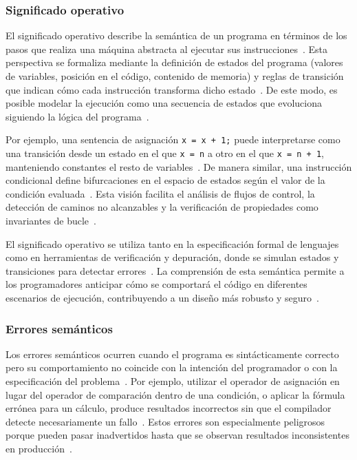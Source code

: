 \documentclass[12pt,twoside]{book}
\begin{document}
					\subsubsection{Significado operativo}
						El significado operativo describe la semántica de un programa en términos de los pasos que realiza una máquina abstracta al ejecutar sus instrucciones~\cite{Tanenbaum2021Structured}. Esta perspectiva se formaliza mediante la definición de estados del programa (valores de variables, posición en el código, contenido de memoria) y reglas de transición que indican cómo cada instrucción transforma dicho estado~\cite{Stallings2021Computer}. De este modo, es posible modelar la ejecución como una secuencia de estados que evoluciona siguiendo la lógica del programa~\cite{Sommerville2015Software}.
						
						Por ejemplo, una sentencia de asignación \texttt{x = x + 1;} puede interpretarse como una transición desde un estado en el que \texttt{x = n} a otro en el que \texttt{x = n + 1}, manteniendo constantes el resto de variables~\cite{Pressman2019Software}. De manera similar, una instrucción condicional define bifurcaciones en el espacio de estados según el valor de la condición evaluada~\cite{Tanenbaum2021Structured}. Esta visión facilita el análisis de flujos de control, la detección de caminos no alcanzables y la verificación de propiedades como invariantes de bucle~\cite{Stallings2021Computer}.
						
						El significado operativo se utiliza tanto en la especificación formal de lenguajes como en herramientas de verificación y depuración, donde se simulan estados y transiciones para detectar errores~\cite{Sommerville2015Software}. La comprensión de esta semántica permite a los programadores anticipar cómo se comportará el código en diferentes escenarios de ejecución, contribuyendo a un diseño más robusto y seguro~\cite{Pressman2019Software}.
				
					\subsubsection{Errores semánticos}
						Los errores semánticos ocurren cuando el programa es sintácticamente correcto pero su comportamiento no coincide con la intención del programador o con la especificación del problema~\cite{Gaddis2022Starting}. Por ejemplo, utilizar el operador de asignación en lugar del operador de comparación dentro de una condición, o aplicar la fórmula errónea para un cálculo, produce resultados incorrectos sin que el compilador detecte necesariamente un fallo~\cite{Pressman2019Software}. Estos errores son especialmente peligrosos porque pueden pasar inadvertidos hasta que se observan resultados inconsistentes en producción~\cite{Sommerville2015Software}.
						
\end{document}
